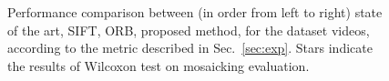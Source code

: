 \documentclass[sn-basic]{sn-jnl}%
\begin{document}
\begin{figure}[t!]
    \centering
    \caption{Performance comparison between (in order from left to right) state of the art, SIFT, ORB, proposed method, for the dataset videos, according to the metric described in Sec.~\ref{sec:exp}. Stars indicate the results of Wilcoxon test on mosaicking evaluation.}
    \label{fig:results_mosaicking}
\end{figure}

\end{document}
